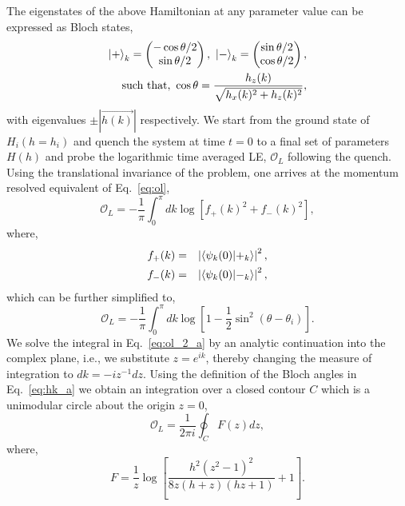 \documentclass[aps,prx,twocolumn]{revtex4-2}
\begin{document}
{{The eigenstates of the above Hamiltonian at any parameter value can be expressed as Bloch states,
\begin{eqnarray}\label{eq:hk_a}
	\nonumber\ket{+}_k=\begin{pmatrix}
		-\cos{\theta/2} \\
		\sin{\theta/2}
	\end{pmatrix},~\ket{-}_k=\begin{pmatrix}
		\sin{\theta/2} \\
		\cos{\theta/2}
	\end{pmatrix},\\
	\text{such that, } \cos{\theta}=\frac{h_z(k)}{\sqrt{h_x(k)^2+h_z(k)^2}},
\end{eqnarray}
with eigenvalues $\pm\left|\vec{h(k)}\right|$ respectively. We start from the ground state of $H_i(h=h_i)$ and quench the system at time $t=0$ to a final set of parameters $H(h)$ and probe the logarithmic time averaged LE, $\mathcal{O}_L$ following the quench.
Using the translational invariance of the problem, one arrives at the momentum resolved equivalent of Eq.~\eqref{eq:ol},
\begin{equation}
	\mathcal{O}_L=-\frac{1}{\pi}\int_0^\pi dk\log{\left[f_{+}(k)^2+f_{-}(k)^2\right]},
\end{equation}
where,
\begin{eqnarray}
	\nonumber f_{+}(k)&=&\left|\braket{\psi_k(0)|+_k}\right|^2, \\
	f_{-}(k)&=&\left|\braket{\psi_k(0)|-_k}\right|^2,
\end{eqnarray}
which can be further simplified to,
\begin{equation}\label{eq:ol_2_a}
	\mathcal{O}_L=-\frac{1}{\pi}\int_0^\pi dk\log{\left[1-\frac{1}{2}\sin^2{(\theta-\theta_i)}\right]}.
\end{equation}
We solve the integral in Eq.~\eqref{eq:ol_2_a} by an analytic continuation into the complex plane, i.e., we substitute $z=e^{ik}$, thereby changing the measure of integration to $dk=-iz^{-1}dz$. Using the definition of the Bloch angles in Eq.~\eqref{eq:hk_a} we obtain an integration over a closed contour $C$ which is a unimodular circle about the origin $z=0$,
\begin{equation}\label{eq:exactle_a}
	\mathcal{O}_L=\frac{1}{2\pi i}\oint_{C}F(z)dz,
\end{equation}
where,
\begin{equation}
	F=\frac{1}{z}\log \left[\frac{h^2 \left(z^2-1\right)^2}{8 z (h+z) (h z+1)}+1\right].
\end{equation}
}}
\end{document}
